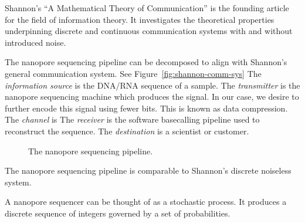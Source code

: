 Shannon's ``A Mathematical Theory of Communication'' \cite{shannon} is the
founding article for the field of information theory. It investigates the
theoretical properties underpinning discrete and continuous communication
systems with and without introduced noise.

The nanopore sequencing pipeline can be decomposed to align with Shannon's
general communication system. See Figure~\ref{fig:shannon-comm-sys}
The \textit{information source} is the DNA/RNA sequence of a sample.
The \textit{transmitter} is the nanopore sequencing machine which produces the
signal. In our case, we desire to further encode this signal using fewer bits.
This is known as data compression.
The \textit{channel} is %
The \textit{receiver} is the software basecalling pipeline used to reconstruct
the sequence.
The \textit{destination} is a scientist or customer.

\begin{figure}
\caption{The nanopore sequencing pipeline.}
\end{figure}

The nanopore sequencing pipeline is comparable to Shannon's discrete noiseless
system.

A nanopore sequencer can be thought of as a stochastic process. It produces a
discrete sequence of integers governed by a set of probabilities.
